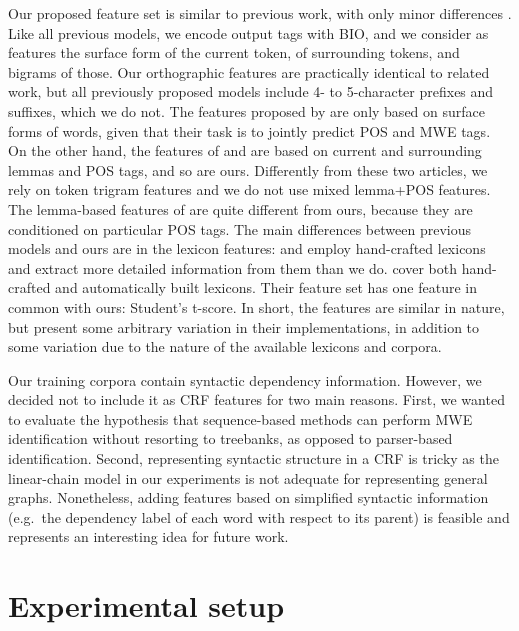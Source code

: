 \documentclass[output=paper,
modfonts
]{langscibook}
\begin{document}
Our proposed feature set is similar to previous work, with only minor differences \citep{constant-sigogne:2011:MWE,schneider2014,riedl-biemann:2016:MWE}. Like all previous models, we encode output tags with BIO, and we consider as features the surface form of the current token, of surrounding tokens, and bigrams of those. Our orthographic features are practically identical to related work, but all previously proposed models include 4- to 5-character prefixes and suffixes, which we do not. The features proposed by \citet{constant-sigogne:2011:MWE} are only based on surface forms of words, given that their task is to jointly predict POS and MWE tags. On the other hand, the features of \citet{schneider2014} and \citet{riedl-biemann:2016:MWE} are based on current and surrounding lemmas and POS tags, and so are ours. Differently from these two articles, we rely on token trigram features and we do not use mixed lemma+POS features. The lemma-based features of \citet{schneider2014} are quite different from ours, because they are conditioned on particular POS tags. The main differences between previous models and ours are in the lexicon features: \citet{constant-sigogne:2011:MWE} and \citet{schneider2014} employ hand-crafted lexicons and extract more detailed information from them than we do. \citet{riedl-biemann:2016:MWE} cover both hand-crafted and automatically built lexicons. Their feature set has one feature in common with ours: Student's t-score. In short, the features are similar in nature, but present some arbitrary variation in their implementations, in addition to some variation due to the nature of the available lexicons and corpora.

Our training corpora contain syntactic dependency information. However, we decided not to include it as CRF features for two main reasons. First, we wanted to evaluate the hypothesis that sequence-based methods can perform MWE identification without resorting to treebanks, as opposed to parser-based identification. Second, representing syntactic structure in a CRF is tricky as the linear-chain model in our experiments is not adequate for representing general graphs. Nonetheless, adding features based on simplified syntactic information (e.g.\ the dependency label of each word with respect to its parent) is feasible and represents an interesting idea for future work.



\section{Experimental setup}
\label{schol:sec:setup}
\end{document}
